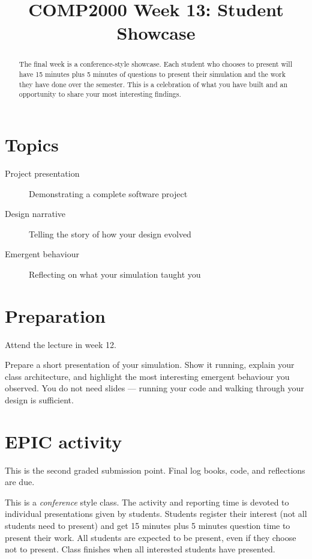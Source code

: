 \documentclass[twoside=false,DIV=14]{scrartcl}
\title{\color{redish} \vspace{-1em}COMP2000 Week 13: Student Showcase}
\begin{document}
{\color{blackish}\maketitle}\vspace{-7em}

\begin{abstract}
The final week is a conference-style showcase.  Each student who chooses to present will have 15 minutes plus 5 minutes of questions to present their simulation and the work they have done over the semester.  This is a celebration of what you have built and an opportunity to share your most interesting findings.
\end{abstract}

\section*{Topics}
\begin{description}
\item[Project presentation] Demonstrating a complete software project
\item[Design narrative] Telling the story of how your design evolved
\item[Emergent behaviour] Reflecting on what your simulation taught you
\end{description}

\section*{Preparation}
Attend the lecture in week 12.\par
Prepare a short presentation of your simulation.  Show it running, explain your class architecture, and highlight the most interesting emergent behaviour you observed.  You do not need slides --- running your code and walking through your design is sufficient.


\section*{EPIC activity}

\begin{note}
This is the second graded submission point.  Final log books, code, and reflections are due.
\end{note}

This is a \emph{conference} style class.  The activity and reporting time is devoted to individual presentations given by students.  Students register their interest (not all students need to present) and get 15 minutes plus 5 minutes question time to present their work.  All students are expected to be present, even if they choose not to present.  Class finishes when all interested students have presented.
\end{document}
